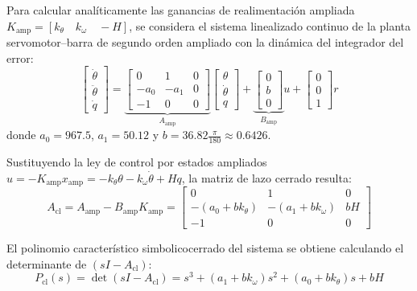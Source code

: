 \documentclass[a4paper, twoside, 10pt, spanish]{article}
\numberwithin{table}{section}
\begin{document}
Para calcular analíticamente las ganancias de realimentación ampliada $K_{\text{amp}} = [k_\theta \quad k_\omega \quad -H]$, se considera el sistema linealizado continuo de la planta servomotor--barra de segundo orden ampliado con la dinámica del integrador del error:
\begin{equation}
\begin{bmatrix} \dot{\theta} \\ \ddot{\theta} \\ \dot{q} \end{bmatrix} = 
\underbrace{\begin{bmatrix} 0 & 1 & 0 \\ -a_0 & -a_1 & 0 \\ -1 & 0 & 0 \end{bmatrix}}_{A_{\text{amp}}} 
\begin{bmatrix} \theta \\ \dot{\theta} \\ q \end{bmatrix} + 
\underbrace{\begin{bmatrix} 0 \\ b \\ 0 \end{bmatrix}}_{B_{\text{amp}}} u + 
\begin{bmatrix} 0 \\ 0 \\ 1 \end{bmatrix} r
\end{equation}
donde $a_0 = 967.5$, $a_1 = 50.12$ y $b = 36.82 \frac{\pi}{180} \approx 0.6426$.

Sustituyendo la ley de control por estados ampliados $u = -K_{\text{amp}} x_{\text{amp}} = -k_\theta \theta - k_\omega \dot{\theta} + H q$, la matriz de lazo cerrado resulta:
\begin{equation}
A_{\text{cl}} = A_{\text{amp}} - B_{\text{amp}} K_{\text{amp}} = 
\begin{bmatrix} 
0 & 1 & 0 \\ 
-(a_0 + b k_\theta) & -(a_1 + b k_\omega) & b H \\ 
-1 & 0 & 0 
\end{bmatrix}
\end{equation}

El polinomio característico simbolicocerrado del sistema se obtiene calculando el determinante de $(sI - A_{\text{cl}})$:
\begin{equation}
P_{\text{cl}}(s) = \det(sI - A_{\text{cl}}) = s^3 + (a_1 + b k_\omega) s^2 + (a_0 + b k_\theta) s + b H
\end{equation}
\end{document}

